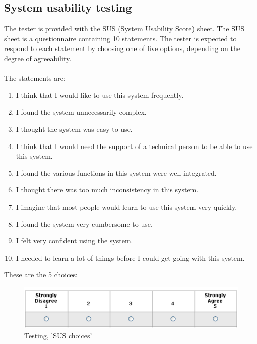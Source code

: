 \subsection{System usability testing}
The tester is provided with the SUS (System Usability Score) sheet. The SUS sheet is a questionnaire containing 10 statements. The tester is expected to respond to each statement by choosing one of five options, depending on the degree of agreeability.\\
\\
The statements are:
\begin{enumerate} \setlength{\itemsep}{0cm}\setlength{\parskip}{0cm}
	\item I think that I would like to use this system frequently.
	\item I found the system unnecessarily complex.
	\item I thought the system was easy to use.
	\item I think that I would need the support of a technical person to be able to use this system.
	\item I found the various functions in this system were well integrated.
	\item I thought there was too much inconsistency in this system.
	\item I imagine that most people would learn to use this system very quickly.
	\item I found the system very cumbersome to use.
	\item I felt very confident using the system.
	\item I needed to learn a lot of things before I could get going with this system.
\end{enumerate}
These are the 5 choices:

\begin{figure}[H]
  \centering
    \includegraphics[width=1.0\textwidth]{img/sus-responses.png}
  \caption{Testing, 'SUS choices'} 
  \label{fig:paperPrototype}
\end{figure}






